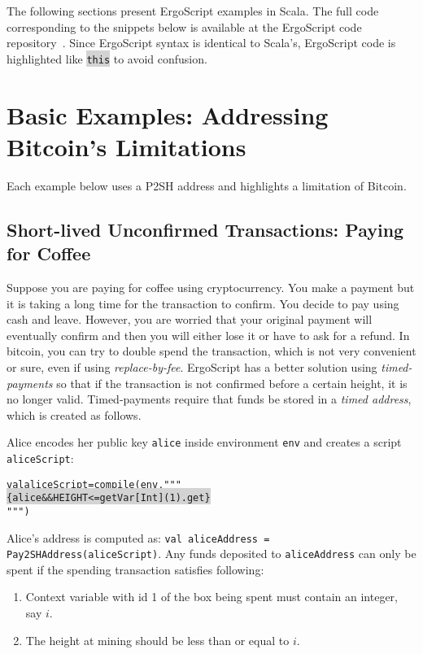 \documentclass[11pt]{article}
\newcommand\Hi[2][lightgray]{%
	\hspace*{-\fboxsep}%
	\colorbox{#1}{#2}%
	\hspace*{-\fboxsep}%
}
\newcommand{\langname}{ErgoScript\xspace}
\begin{document}
The following sections present \langname examples in Scala. The full code corresponding to the snippets below is available at the \langname code repository~\cite{langrepo}. 
Since \langname syntax is identical to Scala's, \langname code is highlighted like \Hi{\texttt{this}} to avoid confusion. 

\section{Basic Examples: Addressing Bitcoin's Limitations}

Each example below uses a P2SH address and highlights a limitation of Bitcoin. 

\subsection{Short-lived Unconfirmed Transactions: Paying for Coffee}

Suppose you are paying for coffee using cryptocurrency. You make a payment but it is taking a long time for the transaction to confirm. You decide to pay using cash and leave. However, you are worried that your original payment will eventually confirm and then you will either lose it or have to ask for a refund. In bitcoin, you can try to double spend the transaction, which is not very convenient or sure, even if using {\em replace-by-fee}. \langname has a better solution using {\em timed-payments} so that if the transaction is not confirmed before a certain height, it is no longer valid. Timed-payments require that funds be stored in a {\em timed address}, which is created as follows. 

Alice encodes her public key \texttt{alice} inside environment \texttt{env} and creates a script \texttt{aliceScript}:
\begin{alltt}
	val aliceScript = compile(env, """ \Hi{\{alice && HEIGHT <= getVar[Int](1).get\}}""")
\end{alltt}

Alice's address is computed as: \texttt{val aliceAddress = Pay2SHAddress(aliceScript)}. Any funds deposited to \texttt{aliceAddress} can only be spent if the spending transaction satisfies following:
\begin{enumerate}
	\item Context variable with id 1 of the box being spent must contain an integer, say $i$.
	\item The height at mining should be less than or equal to $i$. 
\end{enumerate}
\end{document}
